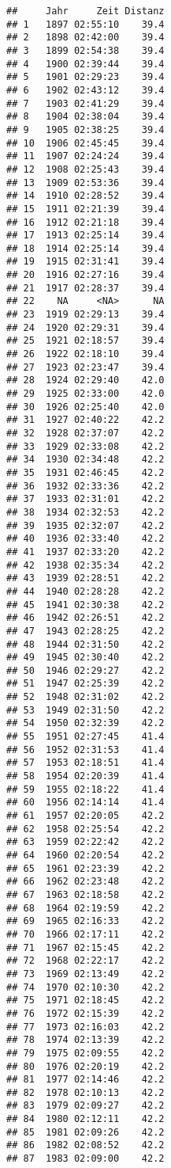 \documentclass[
]{article}
\begin{document}
\begin{verbatim}
##     Jahr     Zeit Distanz
## 1   1897 02:55:10    39.4
## 2   1898 02:42:00    39.4
## 3   1899 02:54:38    39.4
## 4   1900 02:39:44    39.4
## 5   1901 02:29:23    39.4
## 6   1902 02:43:12    39.4
## 7   1903 02:41:29    39.4
## 8   1904 02:38:04    39.4
## 9   1905 02:38:25    39.4
## 10  1906 02:45:45    39.4
## 11  1907 02:24:24    39.4
## 12  1908 02:25:43    39.4
## 13  1909 02:53:36    39.4
## 14  1910 02:28:52    39.4
## 15  1911 02:21:39    39.4
## 16  1912 02:21:18    39.4
## 17  1913 02:25:14    39.4
## 18  1914 02:25:14    39.4
## 19  1915 02:31:41    39.4
## 20  1916 02:27:16    39.4
## 21  1917 02:28:37    39.4
## 22    NA     <NA>      NA
## 23  1919 02:29:13    39.4
## 24  1920 02:29:31    39.4
## 25  1921 02:18:57    39.4
## 26  1922 02:18:10    39.4
## 27  1923 02:23:47    39.4
## 28  1924 02:29:40    42.0
## 29  1925 02:33:00    42.0
## 30  1926 02:25:40    42.0
## 31  1927 02:40:22    42.2
## 32  1928 02:37:07    42.2
## 33  1929 02:33:08    42.2
## 34  1930 02:34:48    42.2
## 35  1931 02:46:45    42.2
## 36  1932 02:33:36    42.2
## 37  1933 02:31:01    42.2
## 38  1934 02:32:53    42.2
## 39  1935 02:32:07    42.2
## 40  1936 02:33:40    42.2
## 41  1937 02:33:20    42.2
## 42  1938 02:35:34    42.2
## 43  1939 02:28:51    42.2
## 44  1940 02:28:28    42.2
## 45  1941 02:30:38    42.2
## 46  1942 02:26:51    42.2
## 47  1943 02:28:25    42.2
## 48  1944 02:31:50    42.2
## 49  1945 02:30:40    42.2
## 50  1946 02:29:27    42.2
## 51  1947 02:25:39    42.2
## 52  1948 02:31:02    42.2
## 53  1949 02:31:50    42.2
## 54  1950 02:32:39    42.2
## 55  1951 02:27:45    41.4
## 56  1952 02:31:53    41.4
## 57  1953 02:18:51    41.4
## 58  1954 02:20:39    41.4
## 59  1955 02:18:22    41.4
## 60  1956 02:14:14    41.4
## 61  1957 02:20:05    42.2
## 62  1958 02:25:54    42.2
## 63  1959 02:22:42    42.2
## 64  1960 02:20:54    42.2
## 65  1961 02:23:39    42.2
## 66  1962 02:23:48    42.2
## 67  1963 02:18:58    42.2
## 68  1964 02:19:59    42.2
## 69  1965 02:16:33    42.2
## 70  1966 02:17:11    42.2
## 71  1967 02:15:45    42.2
## 72  1968 02:22:17    42.2
## 73  1969 02:13:49    42.2
## 74  1970 02:10:30    42.2
## 75  1971 02:18:45    42.2
## 76  1972 02:15:39    42.2
## 77  1973 02:16:03    42.2
## 78  1974 02:13:39    42.2
## 79  1975 02:09:55    42.2
## 80  1976 02:20:19    42.2
## 81  1977 02:14:46    42.2
## 82  1978 02:10:13    42.2
## 83  1979 02:09:27    42.2
## 84  1980 02:12:11    42.2
## 85  1981 02:09:26    42.2
## 86  1982 02:08:52    42.2
## 87  1983 02:09:00    42.2

\end{verbatim}
\end{document}
